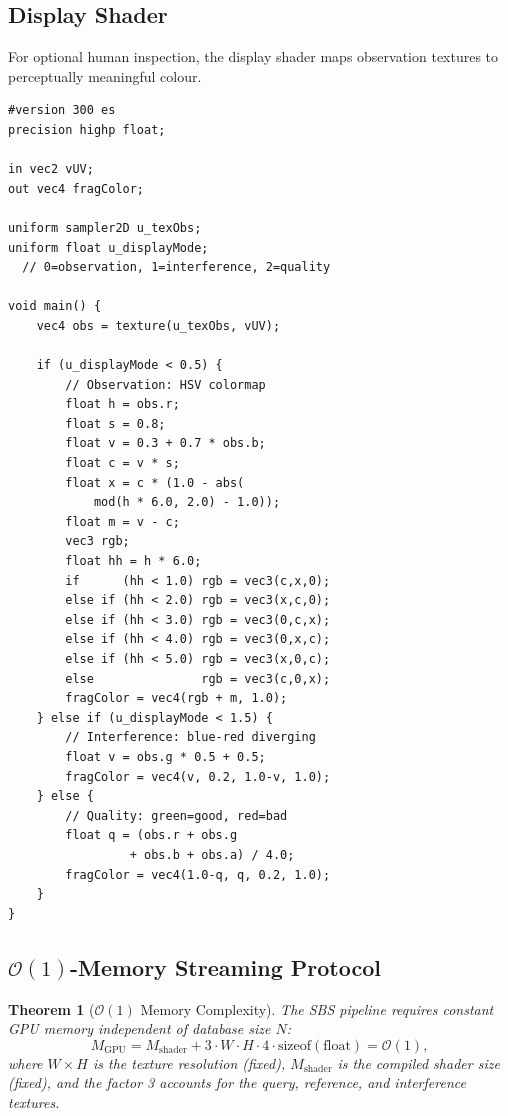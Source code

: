 \documentclass[11pt,twocolumn,a4paper]{article}
\newtheorem{theorem}{Theorem}[section]
\newcommand{\BigO}{\mathcal{O}}
\newcommand{\Mgpu}{M_{\mathrm{GPU}}}
\newcommand{\Mshader}{M_{\mathrm{shader}}}
\begin{document}
\subsection{Display Shader}

For optional human inspection, the display shader maps observation
textures to perceptually meaningful colour.

\begin{lstlisting}[style=glsl,caption={SBS Universal Display Shader.}]
#version 300 es
precision highp float;

in vec2 vUV;
out vec4 fragColor;

uniform sampler2D u_texObs;
uniform float u_displayMode;
  // 0=observation, 1=interference, 2=quality

void main() {
    vec4 obs = texture(u_texObs, vUV);

    if (u_displayMode < 0.5) {
        // Observation: HSV colormap
        float h = obs.r;
        float s = 0.8;
        float v = 0.3 + 0.7 * obs.b;
        float c = v * s;
        float x = c * (1.0 - abs(
            mod(h * 6.0, 2.0) - 1.0));
        float m = v - c;
        vec3 rgb;
        float hh = h * 6.0;
        if      (hh < 1.0) rgb = vec3(c,x,0);
        else if (hh < 2.0) rgb = vec3(x,c,0);
        else if (hh < 3.0) rgb = vec3(0,c,x);
        else if (hh < 4.0) rgb = vec3(0,x,c);
        else if (hh < 5.0) rgb = vec3(x,0,c);
        else               rgb = vec3(c,0,x);
        fragColor = vec4(rgb + m, 1.0);
    } else if (u_displayMode < 1.5) {
        // Interference: blue-red diverging
        float v = obs.g * 0.5 + 0.5;
        fragColor = vec4(v, 0.2, 1.0-v, 1.0);
    } else {
        // Quality: green=good, red=bad
        float q = (obs.r + obs.g
                 + obs.b + obs.a) / 4.0;
        fragColor = vec4(1.0-q, q, 0.2, 1.0);
    }
}
\end{lstlisting}

\subsection{$\BigO(1)$-Memory Streaming Protocol}

\begin{theorem}[$\BigO(1)$ Memory Complexity]
\label{thm:o1-memory}
The SBS pipeline requires constant GPU memory independent of database
size $N$:
\begin{equation}
  \Mgpu = \Mshader + 3 \cdot W \cdot H \cdot 4
  \cdot \mathrm{sizeof(float)} = \BigO(1),
  \label{eq:gpu-memory}
\end{equation}
where $W \times H$ is the texture resolution (fixed), $\Mshader$ is
the compiled shader size (fixed), and the factor 3 accounts for the
query, reference, and interference textures.
\end{theorem}
\end{document}
